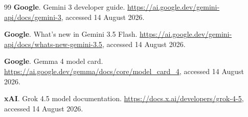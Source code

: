 \documentclass[11pt,a4paper,twocolumn]{article}
\begin{document}
\begin{thebibliography}{99}
\textbf{Google}.
\newblock Gemini 3 developer guide.
\newblock \url{https://ai.google.dev/gemini-api/docs/gemini-3}, accessed 14 August 2026.

\textbf{Google}.
\newblock What's new in Gemini 3.5 Flash.
\newblock \url{https://ai.google.dev/gemini-api/docs/whats-new-gemini-3.5}, accessed 14 August 2026.

\textbf{Google}.
\newblock Gemma 4 model card.
\newblock \url{https://ai.google.dev/gemma/docs/core/model_card_4}, accessed 14 August 2026.

\textbf{xAI}.
\newblock Grok 4.5 model documentation.
\newblock \url{https://docs.x.ai/developers/grok-4-5}, accessed 14 August 2026.

\end{thebibliography}
\end{document}
